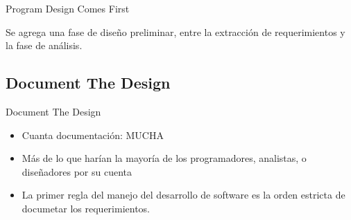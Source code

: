 \documentclass{beamer}
\begin{document}
\begin{frame}{Program Design Comes First}

Se agrega una fase de diseño preliminar, entre la extracción de requerimientos y la fase de análisis.



\end{frame}

\subsection{Document The Design}
\begin{frame}{Document The Design}

\begin{itemize}
\item Cuanta documentación: MUCHA
\item Más de lo que harían la mayoría de los programadores, analistas, o diseñadores por su cuenta
\item La primer regla del manejo del desarrollo de  software es la orden estricta de documetar los requerimientos.
\end{itemize}

\end{frame}
\end{document}
